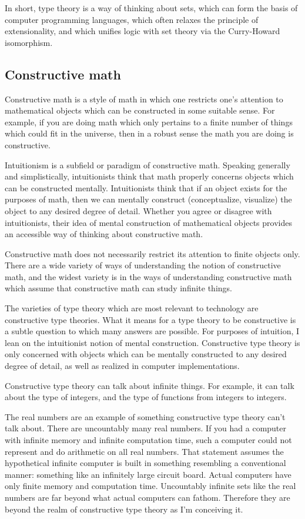 \documentclass{article}
\begin{document}
In short, type theory is a way of thinking about sets, which can form the basis of computer programming languages, which often relaxes the principle of extensionality, and which unifies logic with set theory via the Curry-Howard isomorphism.

\subsection{Constructive math}

Constructive math is a style of math in which one restricts one's attention to mathematical objects which can be constructed in some suitable sense. For example, if you are doing math which only pertains to a finite number of things which could fit in the universe, then in a robust sense the math you are doing is constructive.

Intuitionism is a subfield or paradigm of constructive math. Speaking generally and simplistically, intuitionists think that math properly concerns objects which can be constructed mentally. Intuitionists think that if an object exists for the purposes of math, then we can mentally construct (conceptualize, visualize) the object to any desired degree of detail. Whether you agree or disagree with intuitionists, their idea of mental construction of mathematical objects provides an accessible way of thinking about constructive math.

Constructive math does not necessarily restrict its attention to finite objects only. There are a wide variety of ways of understanding the notion of constructive math, and the widest variety is in the ways of understanding constructive math which assume that constructive math can study infinite things.

The varieties of type theory which are most relevant to technology are constructive type theories. What it means for a type theory to be constructive is a subtle question to which many answers are possible. For purposes of intuition, I lean on the intuitionist notion of mental construction. Constructive type theory is only concerned with objects which can be mentally constructed to any desired degree of detail, as well as realized in computer implementations.

Constructive type theory can talk about infinite things. For example, it can talk about the type of integers, and the type of functions from integers to integers.

The real numbers are an example of something constructive type theory can’t talk about. There are uncountably many real numbers. If you had a computer with infinite memory and infinite computation time, such a computer could not represent and do arithmetic on all real numbers. That statement assumes the hypothetical infinite computer is built in something resembling a conventional manner: something like an infinitely large circuit board. Actual computers have only finite memory and computation time. Uncountably infinite sets like the real numbers are far beyond what actual computers can fathom. Therefore they are beyond the realm of constructive type theory as I’m conceiving it.
\end{document}
